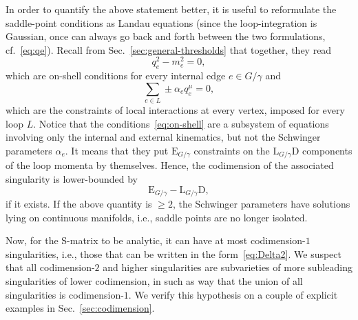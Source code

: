 \documentclass[12pt]{article}
\numberwithin{figure}{section}
\def \be {\begin{equation}}
\def \ee {\end{equation}}
\def \D {\mathrm{D}}
\def \E {\mathrm{E}}
\def \L {\mathrm{L}}
\def \geq {\geqslant}
\begin{document}
				In order to quantify the above statement better, it is useful to reformulate the saddle-point conditions as Landau equations \cite{Bjorken:1959fd,Landau:1959fi,10.1143/PTP.22.128} (since the loop-integration is Gaussian, once can always go back and forth between the two formulations, cf.~\eqref{eq:qe}). Recall from Sec.~\ref{sec:general-thresholds} that together, they read
				\be\label{eq:on-shell}
				q_e^2 - m_e^2 = 0,
				\ee
				which are on-shell conditions for every internal edge $e \in G/\gamma$ and
				\be
				\sum_{e \in L} \pm \alpha_e q_e^\mu = 0,
				\ee
				which are the constraints of local interactions at every vertex, imposed for every loop $L$. Notice that the conditions~\eqref{eq:on-shell}
				are a subsystem of equations involving only the internal and external kinematics, but not the Schwinger parameters $\alpha_e$. It means that they put $\E_{G/\gamma}$ constraints on the $\L_{G/\gamma} \D$ components of the loop momenta by themselves. Hence, the codimension of the associated singularity is lower-bounded by
				\be
				\E_{G/\gamma} - \L_{G/\gamma} \D,
				\ee
				if it exists. If the above quantity is $\geq 2$, the Schwinger parameters have solutions lying on continuous manifolds, i.e., saddle points are no longer isolated.
				
				Now, for the S-matrix to be analytic, it can have at most codimension-$1$ singularities, i.e., those that can be written in the form~\eqref{eq:Delta2}. We suspect that all codimension-$2$ and higher singularities are subvarieties of more subleading singularities of lower codimension, in such as way that the union of all singularities is codimension-$1$. We verify this hypothesis on a couple of explicit examples in Sec.~\ref{sec:codimension}.
				
\end{document}
